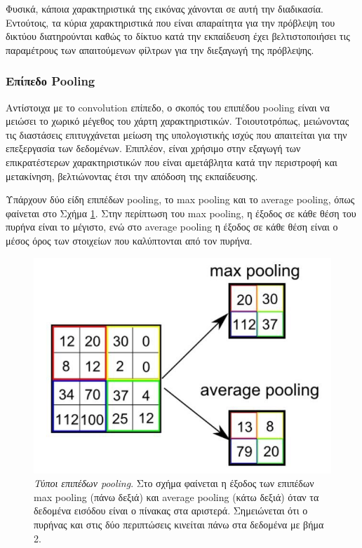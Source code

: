 Φυσικά, κάποια χαρακτηριστικά της εικόνας χάνονται σε αυτή την διαδικασία. Εντούτοις, τα κύρια χαρακτηριστικά που είναι απαραίτητα για την πρόβλεψη του δικτύου διατηρούνται καθώς το δίκτυο κατά την εκπαίδευση έχει βελτιστοποιήσει τις παραμέτρους των απαιτούμενων φίλτρων για την διεξαγωγή της πρόβλεψης.

\subsubsection{Επίπεδο Pooling}
\label{definition:pooling}
	Αντίστοιχα με το convolution επίπεδο, ο σκοπός του επιπέδου pooling είναι να μειώσει το χωρικό μέγεθος του χάρτη χαρακτηριστικών. Τοιουτοτρόπως, μειώνοντας τις διαστάσεις επιτυγχάνεται μείωση της υπολογιστικής ισχύς που απαιτείται για την επεξεργασία των δεδομένων. Επιπλέον, είναι χρήσιμο στην εξαγωγή των επικρατέστερων χαρακτηριστικών που είναι αμετάβλητα κατά την περιστροφή και μετακίνηση, βελτιώνοντας έτσι την απόδοση της εκπαίδευσης.
	
	Υπάρχουν δύο είδη επιπέδων pooling, το max pooling και το average pooling, όπως φαίνεται στο Σχήμα \ref{fig:pooling_example}. Στην περίπτωση του max pooling, η έξοδος σε κάθε θέση του πυρήνα είναι το μέγιστο, ενώ στο average pooling η έξοδος σε κάθε θέση είναι ο μέσος όρος των στοιχείων που καλύπτονται από τον πυρήνα.
	
	\begin{figure}[H]
		\centering
		\includegraphics[scale=0.5]{images/appendix/pooling_example.png}
		\caption[Τύποι επιπέδων pooling]{\textsl{Τύποι επιπέδων pooling}. Στο σχήμα φαίνεται η έξοδος των επιπέδων max pooling (πάνω δεξιά) και average pooling (κάτω δεξιά) όταν τα δεδομένα εισόδου είναι ο πίνακας στα αριστερά. Σημειώνεται ότι ο πυρήνας και στις δύο περιπτώσεις κινείται πάνω στα δεδομένα με βήμα 2.}
		\label{fig:pooling_example}
	\end{figure}

